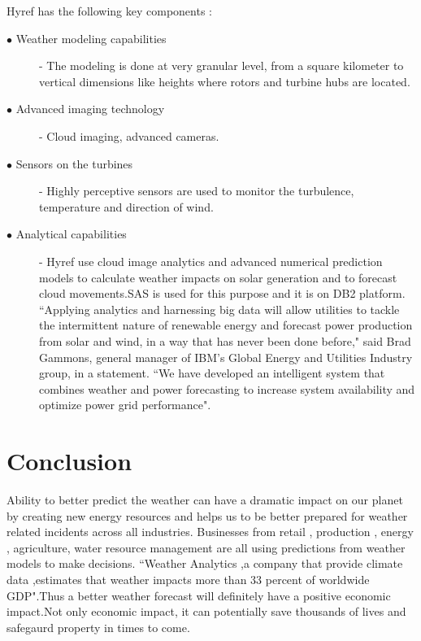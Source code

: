 \documentclass[sigconf]{acmart}
\begin{document}
Hyref has the following key components :\\

\begin{description}

\item [$\bullet$ Weather modeling capabilities] - The modeling is done at very granular level, from a square kilometer to vertical dimensions like heights where rotors and turbine hubs are located.

\item [$\bullet$ Advanced imaging technology] - Cloud imaging, advanced cameras.

\item [$\bullet$ Sensors on the turbines] - Highly perceptive sensors are used to monitor the turbulence, temperature and direction of wind.

\item [$\bullet$ Analytical capabilities] - Hyref use cloud image analytics and advanced numerical prediction models to calculate weather impacts on solar generation and to forecast cloud movements.SAS is used for this purpose and it is on DB2 platform\cite{Hyref04}.\\


``Applying analytics and harnessing big data will allow utilities to tackle the intermittent nature of renewable energy and forecast power production from solar and wind, in a way that has never been done before," said Brad Gammons, general manager of IBM's Global Energy and Utilities Industry group, in a statement. ``We have developed an intelligent system that combines weather and power forecasting to increase system availability and optimize power grid performance"\cite{Hyref03}.

\end{description}


\section{Conclusion}


Ability to better predict the weather can have a dramatic impact on our planet by creating new energy resources and helps us to be better prepared for weather related incidents across all industries. Businesses from retail , production , energy , agriculture, water resource management are all using predictions from weather models to make decisions. ``Weather Analytics ,a company that provide climate data ,estimates that weather impacts more than 33 percent of worldwide GDP"\cite{Coclus01}.Thus a better weather forecast will definitely have a positive economic impact.Not only economic impact, it can potentially save thousands of lives and safegaurd property in times to come.\\
\end{document}

